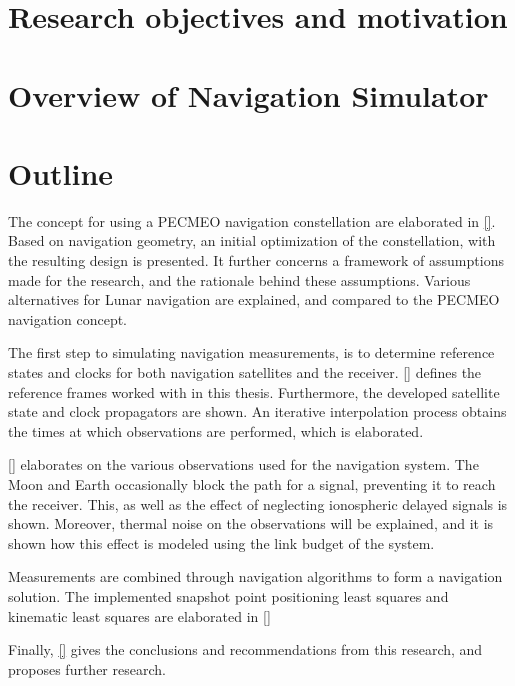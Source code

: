\section{Research objectives and motivation}


\section{Overview of Navigation Simulator}


\section{Outline}
The concept for using a PECMEO navigation constellation are elaborated in \autoref{}.
Based on navigation geometry, an initial optimization of the constellation, with the resulting design is presented. 
It further concerns a framework of assumptions made for the research, and the rationale behind these assumptions. 
Various alternatives for Lunar navigation are explained, and compared to the PECMEO navigation concept.

The first step to simulating navigation measurements, is to determine reference states and clocks for both navigation satellites and the receiver.
\autoref{} defines the reference frames worked with in this thesis. 
Furthermore, the developed satellite state and clock propagators are shown.
An iterative interpolation process obtains the times at which observations are performed, which is elaborated.

\autoref{} elaborates on the various observations used for the navigation system.
The Moon and Earth occasionally block the path for a signal, preventing it to reach the receiver.
This, as well as the effect of neglecting ionospheric delayed signals is shown.
Moreover, thermal noise on the observations will be explained, and it is shown how this effect is modeled using the link budget of the system.

Measurements are combined through navigation algorithms to form a navigation solution.
The implemented snapshot point positioning least squares and kinematic least squares are elaborated in \autoref{}

Finally, \autoref{} gives the conclusions and recommendations from this research, and proposes further research.